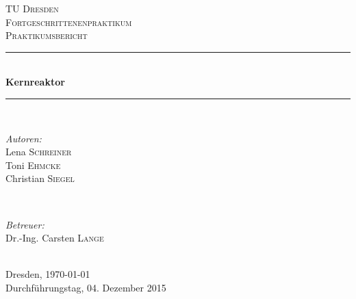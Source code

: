\begin{titlepage}
\newcommand{\HRule}{\rule{\linewidth}{0.5mm}} %

\center %
 

\textsc{\LARGE TU Dresden}\\[1.5cm] %
\textsc{\Large Fortgeschrittenenpraktikum}\\[0.5cm] %
\textsc{\Large Praktikumsbericht}\\[0.5cm] %


\HRule \\[0.7cm]
{ \huge \bfseries Kernreaktor}\\[0.4cm] %
\HRule \\[1.5cm]
 

\begin{minipage}{0.4\textwidth}
\begin{flushleft} \large
\emph{Autoren:}\\
Lena \textsc{Schreiner}\\
Toni \textsc{Ehmcke}\\
Christian \textsc{Siegel}
\end{flushleft}
\end{minipage}
~
\begin{minipage}{0.4\textwidth}
\begin{flushright} \large
\emph{Betreuer:} \\
Dr.-Ing. Carsten \textsc{Lange} %
\end{flushright}
\end{minipage}\\[4cm]


{\large Dresden, \today}\\
\vspace{5mm}
{\large Durchführungstag, 04. Dezember 2015}\\

\vfill 

\end{titlepage}